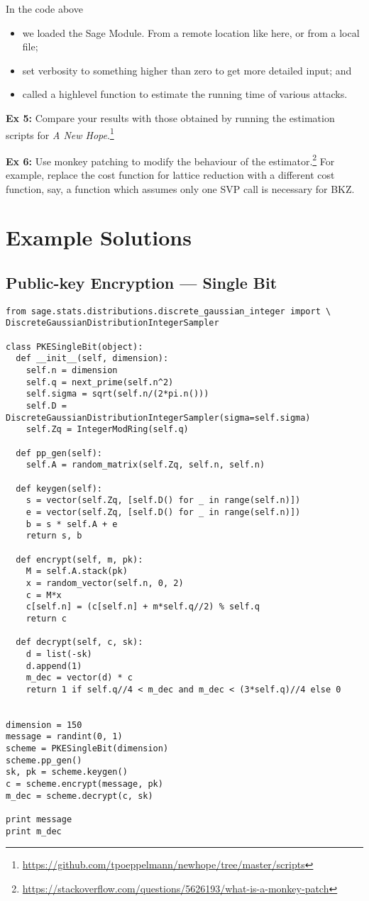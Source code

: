 \documentclass[10pt,a4paper,nobib]{tufte-handout}
\begin{document}
In the code above

\begin{itemize}
\item we loaded the Sage Module. From a remote location like here, or from a local file;
\item set verbosity to something higher than zero to get more detailed input; and
\item called a highlevel function to estimate the running time of various attacks.
\end{itemize}

\textbf{Ex 5:} Compare your results with those obtained by running the estimation scripts for \emph{A New Hope}.\footnote{\url{https://github.com/tpoeppelmann/newhope/tree/master/scripts}}

\textbf{Ex 6:} Use monkey patching to modify the behaviour of the estimator.\footnote{\url{https://stackoverflow.com/questions/5626193/what-is-a-monkey-patch}} For example, replace the cost function for lattice reduction with a different cost function, say, a function which assumes only one SVP call is necessary for BKZ.

\section{Example Solutions}

\subsection{Public-key Encryption --- Single Bit}

\lstset{language=sage,label= ,caption= ,captionpos=b,numbers=none}
\begin{lstlisting}
from sage.stats.distributions.discrete_gaussian_integer import \
DiscreteGaussianDistributionIntegerSampler

class PKESingleBit(object):
  def __init__(self, dimension):
    self.n = dimension
    self.q = next_prime(self.n^2)
    self.sigma = sqrt(self.n/(2*pi.n()))
    self.D = DiscreteGaussianDistributionIntegerSampler(sigma=self.sigma)
    self.Zq = IntegerModRing(self.q)

  def pp_gen(self):
    self.A = random_matrix(self.Zq, self.n, self.n)

  def keygen(self):
    s = vector(self.Zq, [self.D() for _ in range(self.n)])
    e = vector(self.Zq, [self.D() for _ in range(self.n)])
    b = s * self.A + e
    return s, b

  def encrypt(self, m, pk):
    M = self.A.stack(pk)
    x = random_vector(self.n, 0, 2)
    c = M*x 
    c[self.n] = (c[self.n] + m*self.q//2) % self.q
    return c

  def decrypt(self, c, sk):
    d = list(-sk)
    d.append(1)
    m_dec = vector(d) * c
    return 1 if self.q//4 < m_dec and m_dec < (3*self.q)//4 else 0


dimension = 150
message = randint(0, 1)
scheme = PKESingleBit(dimension)
scheme.pp_gen()
sk, pk = scheme.keygen()
c = scheme.encrypt(message, pk)
m_dec = scheme.decrypt(c, sk)

print message
print m_dec
\end{lstlisting}
\end{document}
